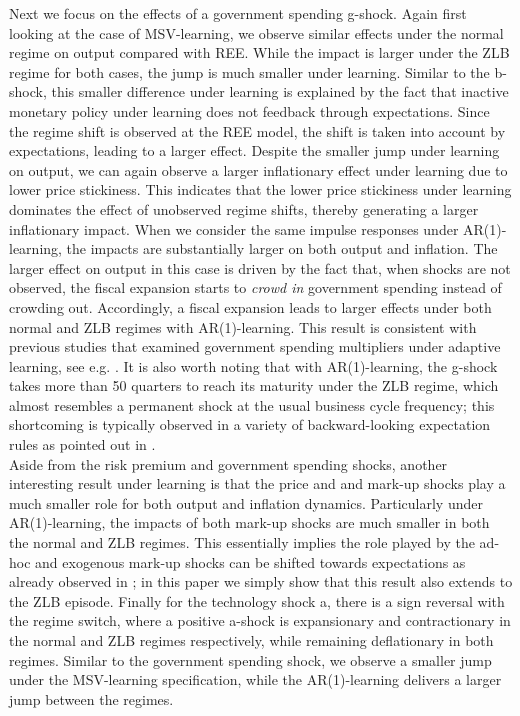 \documentclass[12pt,reqno]{article}
\numberwithin{equation}{section}
\begin{document}
\noindent
Next we focus on the effects of a government spending g-shock. Again first looking at the case of MSV-learning, we observe similar effects under the normal regime on output compared with REE. While the impact is larger under the ZLB regime for both cases, the jump is much smaller under learning. Similar to the b-shock, this smaller difference under learning is explained by the fact that inactive monetary policy under learning does not feedback through expectations. Since the regime shift is observed at the REE model, the shift is taken into account by expectations, leading to a larger effect. Despite the smaller jump under learning on output, we can again observe a larger inflationary effect under learning due to lower price stickiness. This indicates that the lower price stickiness under learning dominates the effect of unobserved regime shifts, thereby generating a larger inflationary impact. When we consider the same impulse responses under AR(1)-learning, the impacts are substantially larger on both output and inflation. The larger effect on output in this case is driven by the fact that, when shocks are not observed, the fiscal expansion starts to \textit{crowd in} government spending instead of crowding out. Accordingly, a fiscal expansion leads to larger effects under both normal and ZLB regimes with AR(1)-learning. This result is consistent with previous studies that examined government spending multipliers under adaptive learning, see e.g. \cite{quaghebeur2018learning}. It is also worth noting that with AR(1)-learning, the g-shock takes more than 50 quarters to reach its maturity under the ZLB regime, which almost resembles a permanent shock at the usual business cycle frequency; this shortcoming is typically observed in a variety of backward-looking expectation rules as pointed out in \cite{christopher2018learning}. \\

\noindent
Aside from the risk premium and government spending shocks, another interesting result under learning is that the price and and mark-up shocks play a much smaller role for both output and inflation dynamics. Particularly under AR(1)-learning, the impacts of both mark-up shocks are much smaller in both the normal and ZLB regimes. This essentially implies the role played by the ad-hoc and exogenous mark-up shocks can be shifted towards expectations as already observed in \cite{slobodyan2012alearning}; in this paper we simply show that this result also extends to the ZLB episode. Finally for the technology shock a, there is a sign reversal with the regime switch, where a positive a-shock is expansionary and contractionary in the normal and ZLB regimes respectively, while remaining deflationary in both regimes. Similar to the government spending shock, we observe a smaller jump under the MSV-learning specification, while the AR(1)-learning delivers a larger jump between the regimes. \\
\end{document}
